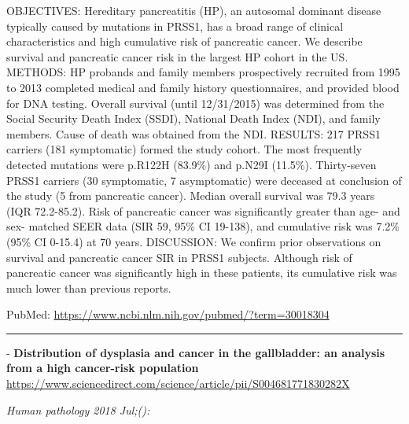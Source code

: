 \documentclass[]{article}
\begin{document}
OBJECTIVES: Hereditary pancreatitis (HP), an autosomal dominant disease
typically caused by mutations in PRSS1, has a broad range of clinical
characteristics and high cumulative risk of pancreatic cancer. We
describe survival and pancreatic cancer risk in the largest HP cohort in
the US. METHODS: HP probands and family members prospectively recruited
from 1995 to 2013 completed medical and family history questionnaires,
and provided blood for DNA testing. Overall survival (until 12/31/2015)
was determined from the Social Security Death Index (SSDI), National
Death Index (NDI), and family members. Cause of death was obtained from
the NDI. RESULTS: 217 PRSS1 carriers (181 symptomatic) formed the study
cohort. The most frequently detected mutations were p.R122H (83.9\%) and
p.N29I (11.5\%). Thirty-seven PRSS1 carriers (30 symptomatic, 7
asymptomatic) were deceased at conclusion of the study (5 from
pancreatic cancer). Median overall survival was 79.3 years (IQR
72.2-85.2). Risk of pancreatic cancer was significantly greater than
age- and sex- matched SEER data (SIR 59, 95\% CI 19-138), and cumulative
risk was 7.2\% (95\% CI 0-15.4) at 70 years. DISCUSSION: We confirm
prior observations on survival and pancreatic cancer SIR in PRSS1
subjects. Although risk of pancreatic cancer was significantly high in
these patients, its cumulative risk was much lower than previous
reports.

PubMed: \url{https://www.ncbi.nlm.nih.gov/pubmed/?term=30018304}

{}

{}

\begin{center}\rule{0.5\linewidth}{\linethickness}\end{center}

 - \textbf{Distribution of dysplasia and cancer in the gallbladder: an
analysis from a high cancer-risk population}
\url{https://www.sciencedirect.com/science/article/pii/S004681771830282X}

\emph{Human pathology 2018 Jul;():}
\end{document}
